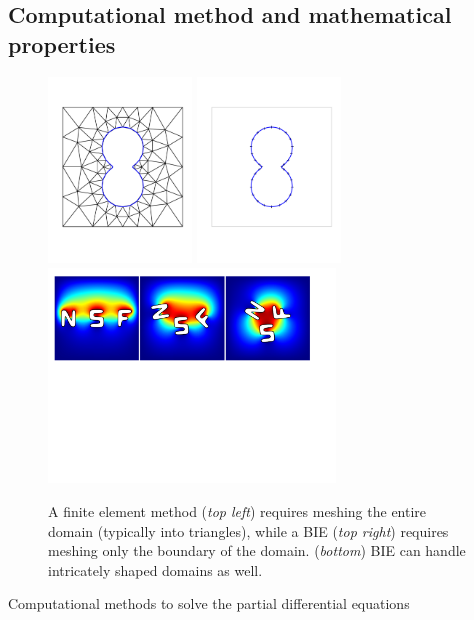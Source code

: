 \subsection{Computational method and mathematical properties}
\begin{figure}
  \vspace{-0pt}
  \centering
  \includegraphics[width=1.5in]{figures/Background/Peanut/PeanutFEM.pdf}
  \includegraphics[width=1.5in]{figures/Background/Peanut/PeanutIE.pdf}\\
  \includegraphics[width=3in]{figures/Background/NSF.pdf}\\
\caption{\label{fig:fem_vs_bie} \footnotesize A finite element method
  ({\em top left}) requires meshing the entire domain (typically into
  triangles), while a BIE ({\em top right}) requires meshing only the
  boundary of the domain.
  ({\em bottom}) BIE can handle intricately shaped domains as well.}
\end{figure}
Computational methods to solve the partial differential equations
